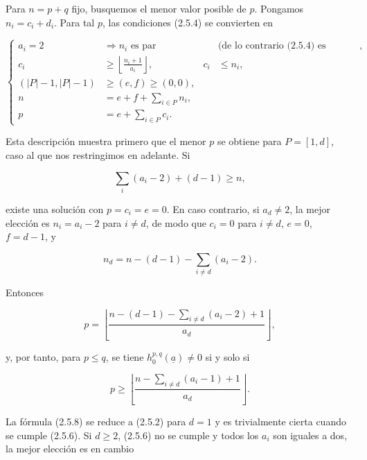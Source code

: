 Para $n=p+q$ fijo, busquemos el menor valor posible de $p$. Pongamos
$n_i=c_i+d_i$. Para tal $p$, las condiciones (2.5.4) se convierten en

\pageoriginale

{\small\begin{equation}\tag{2.5.5}
\left\{
\begin{aligned}
a_i=2&\Longrightarrow n_i\text{ es par}
&&\text{(de lo contrario (2.5.4) es imposible)},\\
c_i&\geq\left\lfloor\frac{n_i+1}{a_i}\right\rfloor,
&c_i&\leq n_i,\\
(|P|-1,|P|-1)&\geq(e,f)\geq(0,0),&&\\
n&=e+f+\sum_{i\in P}n_i,&&\\
p&=e+\sum_{i\in P}c_i.&&
\end{aligned}
\right.
\end{equation}}

Esta descripción muestra primero que el menor $p$ se obtiene para
$P=[1,d]$, caso al que nos restringimos en adelante. Si

\begin{equation}\tag{2.5.6}
\sum_i(a_i-2)+(d-1)\geq n,
\end{equation}

existe una solución con $p=c_i=e=0$. En caso contrario, si $a_d\ne2$, la
mejor elección es $n_i=a_i-2$ para $i\ne d$, de modo que $c_i=0$ para
$i\ne d$, $e=0$, $f=d-1$, y

\begin{equation*}
n_d=n-(d-1)-\sum_{i\ne d}(a_i-2).
\end{equation*}

Entonces

\begin{equation}\tag{2.5.7}
p=\left\lfloor
\frac{n-(d-1)-\sum_{i\ne d}(a_i-2)+1}{a_d}
\right\rfloor,
\end{equation}

y, por tanto, para $p\leq q$, se tiene
$h_0^{p,q}(\underline a)\ne0$ si y solo si

\begin{equation}\tag{2.5.8}
p\geq\left\lfloor
\frac{n-\sum_{i\ne d}(a_i-1)+1}{a_d}
\right\rfloor.
\end{equation}

La fórmula (2.5.8) se reduce a (2.5.2) para $d=1$ y es trivialmente cierta
cuando se cumple (2.5.6). Si $d\geq2$, (2.5.6) no se cumple y todos los
$a_i$ son iguales a dos, la mejor elección es en cambio

\pageoriginale

